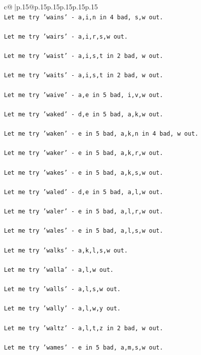 \documentclass{article}
\begin{document}
{\begin{supertabular}{c@{$\;$}|p{.15\linewidth}@{}p{.15\linewidth}p{.15\linewidth}p{.15\linewidth}p{.15\linewidth}p{.15\linewidth}}
{{{\\ 
\texttt{Let me try 'wains' {-} a,i,n in 4 bad, s,w out. } \\
\\ 
\texttt{Let me try 'wairs' {-} a,i,r,s,w out. } \\
\\ 
\texttt{Let me try 'waist' {-} a,i,s,t in 2 bad, w out. } \\
\\ 
\texttt{Let me try 'waits' {-} a,i,s,t in 2 bad, w out. } \\
\\ 
\texttt{Let me try 'waive' {-} a,e in 5 bad, i,v,w out. } \\
\\ 
\texttt{Let me try 'waked' {-} d,e in 5 bad, a,k,w out. } \\
\\ 
\texttt{Let me try 'waken' {-} e in 5 bad, a,k,n in 4 bad, w out. } \\
\\ 
\texttt{Let me try 'waker' {-} e in 5 bad, a,k,r,w out. } \\
\\ 
\texttt{Let me try 'wakes' {-} e in 5 bad, a,k,s,w out. } \\
\\ 
\texttt{Let me try 'waled' {-} d,e in 5 bad, a,l,w out. } \\
\\ 
\texttt{Let me try 'waler' {-} e in 5 bad, a,l,r,w out. } \\
\\ 
\texttt{Let me try 'wales' {-} e in 5 bad, a,l,s,w out. } \\
\\ 
\texttt{Let me try 'walks' {-} a,k,l,s,w out. } \\
\\ 
\texttt{Let me try 'walla' {-} a,l,w out. } \\
\\ 
\texttt{Let me try 'walls' {-} a,l,s,w out. } \\
\\ 
\texttt{Let me try 'wally' {-} a,l,w,y out. } \\
\\ 
\texttt{Let me try 'waltz' {-} a,l,t,z in 2 bad, w out. } \\
\\ 
\texttt{Let me try 'wames' {-} e in 5 bad, a,m,s,w out. } \\
\\ 
}}}
\end{supertabular}}
\end{document}
